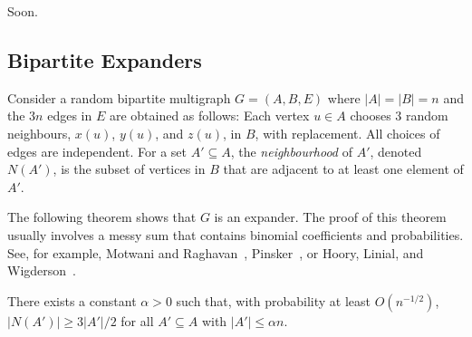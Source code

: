 \documentclass{patmorin}
\begin{document}
Soon.


\subsection{Bipartite Expanders}

Consider a random bipartite multigraph $G=(A,B,E)$ where $|A|=|B|=n$
and the $3n$ edges in $E$ are obtained as follows: Each vertex $u\in
A$ chooses 3 random neighbours, $x(u)$, $y(u)$, and $z(u)$, in $B$,
with replacement.  All choices of edges are independent. For a set
$A'\subseteq A$, the \emph{neighbourhood} of $A'$, denoted $N(A')$, is
the subset of vertices in $B$ that are adjacent to at least one
element of $A'$.

The following theorem shows that $G$ is an expander.  The proof of
this theorem usually involves a messy sum that contains binomial
coefficients and probabilities.  See, for example, Motwani and
Raghavan~\cite[Theorem~5.3]{motwani.raghavan:randomized},
Pinsker~\cite[Lemma 1]{pinsker:on}, or Hoory, Linial, and
Wigderson~\cite[Lemma~1.9]{hoory.linial.ea:expander}.

\begin{thm}
  There exists a constant $\alpha >0$ such that, with probability at
  least $O(n^{-1/2})$, $|N(A')| \ge 3|A'|/2$ for all $A'\subseteq A$
  with $|A'|\le \alpha n$.
\end{thm}
\end{document}
